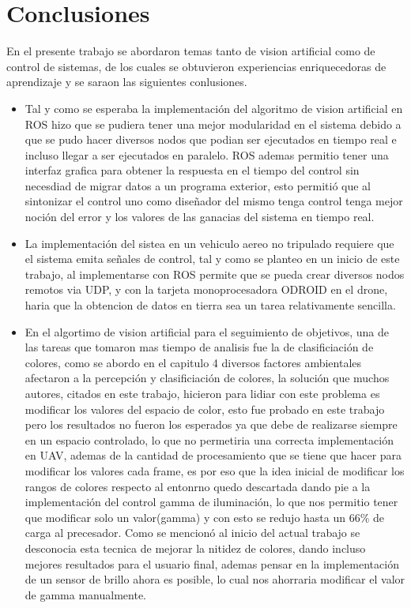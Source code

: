 \chapter{Conclusiones}
En el presente trabajo se abordaron temas tanto de vision artificial como de control de sistemas, de los cuales se obtuvieron
experiencias enriquecedoras de aprendizaje y se saraon las siguientes conlusiones.
\begin{itemize}
    \item Tal y como se esperaba la implementación del algoritmo de vision artificial en ROS hizo que se pudiera tener una mejor modularidad 
    en el sistema debido a que se pudo hacer diversos nodos que podian ser ejecutados en tiempo real e incluso llegar a ser 
    ejecutados en paralelo. ROS ademas permitio tener una interfaz grafica para obtener la respuesta en el tiempo del control sin necesdiad
    de migrar datos a un programa exterior, esto permitió que al sintonizar el control uno como diseñador del mismo tenga control tenga 
    mejor noción del error y los valores de las ganacias del sistema en tiempo real.
    \item La implementación del sistea en un vehiculo aereo no tripulado requiere que el sistema emita señales de control, tal y como 
    se planteo en un inicio de este trabajo, al implementarse con ROS permite que se pueda crear diversos nodos remotos via UDP, y con 
    la tarjeta monoprocesadora ODROID en el drone, haria que la obtencion de datos en tierra sea un tarea relativamente sencilla.
    \item En el algortimo de vision artificial para el seguimiento de objetivos, una de las tareas que tomaron mas tiempo de analisis 
    fue la de clasificiación de colores, como se abordo en el capitulo 4 diversos factores ambientales afectaron a la percepción y 
    clasificiación de colores, la solución que muchos autores, citados en este trabajo, hicieron para lidiar con este problema es modificar 
    los valores del espacio de color, esto fue probado en este trabajo pero los resultados no fueron los esperados ya que debe de realizarse 
    siempre en un espacio controlado, lo que no permetiria una correcta implementación en UAV, ademas de la cantidad de procesamiento 
    que se tiene que hacer para modificar los valores cada frame, es por eso que la idea inicial de modificar los rangos de colores respecto
    al entonrno quedo descartada dando pie a la implementación del control gamma de iluminación, lo que nos permitio tener que modificar 
    solo un valor(gamma) y con esto se redujo hasta un 66\% de carga al precesador. Como se mencionó al inicio del actual trabajo se desconocia
    esta tecnica de mejorar la nitidez de colores, dando incluso mejores resultados para el usuario final, ademas pensar en la implementación
    de un sensor de brillo ahora es posible, lo cual nos ahorraria modificar el valor de gamma manualmente.
\end{itemize}

